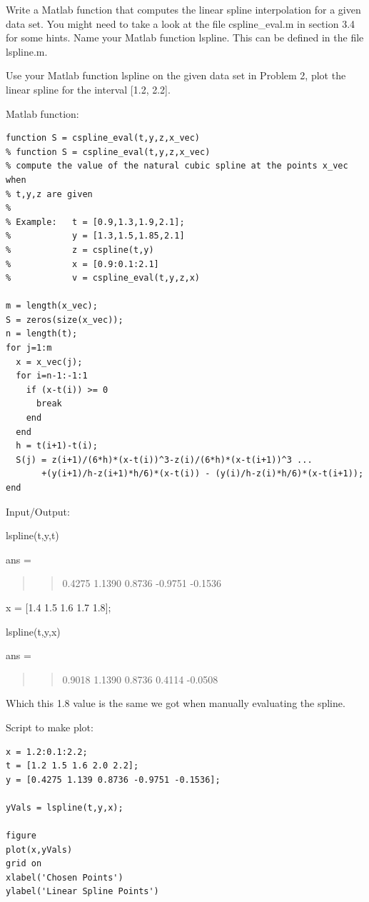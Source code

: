 \documentclass[]{article}
\begin{document}
Write a Matlab function that computes the linear spline interpolation
for a given data set. You might need to take a look at the file
cspline\_eval.m in section 3.4 for some hints. Name your Matlab function
lspline. This can be defined in the file lspline.m.

Use your Matlab function lspline on the given data set in Problem 2,
plot the linear spline for the interval {[}1.2, 2.2{]}.

Matlab function:

\begin{verbatim}
function S = cspline_eval(t,y,z,x_vec)
% function S = cspline_eval(t,y,z,x_vec)
% compute the value of the natural cubic spline at the points x_vec when
% t,y,z are given
%
% Example:   t = [0.9,1.3,1.9,2.1];
%            y = [1.3,1.5,1.85,2.1]
%            z = cspline(t,y)
%            x = [0.9:0.1:2.1]
%            v = cspline_eval(t,y,z,x)

m = length(x_vec);
S = zeros(size(x_vec));  
n = length(t);
for j=1:m
  x = x_vec(j);
  for i=n-1:-1:1
    if (x-t(i)) >= 0
      break
    end
  end
  h = t(i+1)-t(i);
  S(j) = z(i+1)/(6*h)*(x-t(i))^3-z(i)/(6*h)*(x-t(i+1))^3 ...
       +(y(i+1)/h-z(i+1)*h/6)*(x-t(i)) - (y(i)/h-z(i)*h/6)*(x-t(i+1));
end
\end{verbatim}

Input/Output:

lspline(t,y,t)

ans =

\begin{quote}
\begin{quote}
0.4275 1.1390 0.8736 -0.9751 -0.1536
\end{quote}
\end{quote}

x = {[}1.4 1.5 1.6 1.7 1.8{]};

lspline(t,y,x)

ans =

\begin{quote}
\begin{quote}
0.9018 1.1390 0.8736 0.4114 -0.0508
\end{quote}
\end{quote}

Which this 1.8 value is the same we got when manually evaluating the
spline.

Script to make plot:

\begin{verbatim}
x = 1.2:0.1:2.2;
t = [1.2 1.5 1.6 2.0 2.2];
y = [0.4275 1.139 0.8736 -0.9751 -0.1536];

yVals = lspline(t,y,x);

figure
plot(x,yVals)
grid on
xlabel('Chosen Points')
ylabel('Linear Spline Points')
\end{verbatim}
\end{document}
